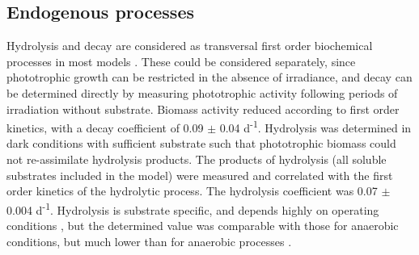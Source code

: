 \subsection{Endogenous processes}
Hydrolysis and decay are considered as transversal first order biochemical processes in most models \cite{Batstone2006, Henze2000, Szilvester2010}. These could be considered separately, since phototrophic growth can be restricted in the absence of irradiance, and decay can be determined directly by measuring phototrophic activity following periods of irradiation without substrate. Biomass activity reduced according to first order kinetics, with a decay coefficient of \num{0.09} $\pm$ \num{0.04} d\textsuperscript{-1}. Hydrolysis was determined in dark conditions with sufficient substrate such that phototrophic biomass could not re-assimilate hydrolysis products. The products of hydrolysis (all soluble substrates included in the model) were measured and correlated with the first order kinetics of the hydrolytic process. The hydrolysis coefficient was \num{0.07} $\pm$ \num{0.004} d\textsuperscript{-1}. Hydrolysis is substrate specific, and depends highly on operating conditions \cite{Batstone2015}, but the determined value was comparable with those for anaerobic conditions, but much lower than for anaerobic processes \cite{Henze2000}. 

